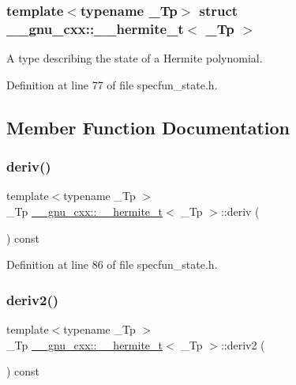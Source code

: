 \subsubsection*{template$<$typename \+\_\+\+Tp$>$\newline
struct \+\_\+\+\_\+gnu\+\_\+cxx\+::\+\_\+\+\_\+hermite\+\_\+t$<$ \+\_\+\+Tp $>$}

A type describing the state of a Hermite polynomial. 

Definition at line 77 of file specfun\+\_\+state.\+h.



\subsection{Member Function Documentation}
\mbox{\label{struct____gnu__cxx_1_1____hermite__t_aa92fd4096ca98fedad08b95187bb7a34}} 
\subsubsection{\texorpdfstring{deriv()}{deriv()}}
{\footnotesize\ttfamily template$<$typename \+\_\+\+Tp $>$ \\
\+\_\+\+Tp \hyperlink{struct____gnu__cxx_1_1____hermite__t}{\+\_\+\+\_\+gnu\+\_\+cxx\+::\+\_\+\+\_\+hermite\+\_\+t}$<$ \+\_\+\+Tp $>$\+::deriv (\begin{DoxyParamCaption}{ }\end{DoxyParamCaption}) const\hspace{0.3cm}{\ttfamily [inline]}}



Definition at line 86 of file specfun\+\_\+state.\+h.

\mbox{\label{struct____gnu__cxx_1_1____hermite__t_a2deb14d149cf302151ae1d318adec995}} 
\subsubsection{\texorpdfstring{deriv2()}{deriv2()}}
{\footnotesize\ttfamily template$<$typename \+\_\+\+Tp $>$ \\
\+\_\+\+Tp \hyperlink{struct____gnu__cxx_1_1____hermite__t}{\+\_\+\+\_\+gnu\+\_\+cxx\+::\+\_\+\+\_\+hermite\+\_\+t}$<$ \+\_\+\+Tp $>$\+::deriv2 (\begin{DoxyParamCaption}{ }\end{DoxyParamCaption}) const\hspace{0.3cm}{\ttfamily [inline]}}



